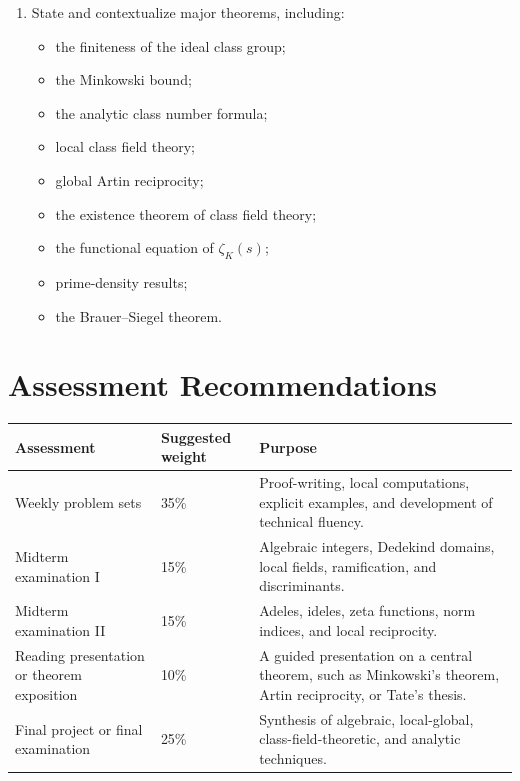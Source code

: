 \documentclass[11pt]{article}
\begin{document}
\begin{enumerate}
    \item State and contextualize major theorems, including:
    \begin{itemize}
        \item the finiteness of the ideal class group;
        \item the Minkowski bound;
        \item the analytic class number formula;
        \item local class field theory;
        \item global Artin reciprocity;
        \item the existence theorem of class field theory;
        \item the functional equation of $\zeta_K(s)$;
        \item prime-density results;
        \item the Brauer--Siegel theorem.
    \end{itemize}
\end{enumerate}

\section{Assessment Recommendations}

\begin{longtable}{p{}p{}p{}}
\toprule
\textbf{Assessment} & \textbf{Suggested weight} & \textbf{Purpose} \\
\midrule
\endhead

Weekly problem sets &
35\% &
Proof-writing, local computations, explicit examples, and development of technical fluency. \\

Midterm examination I &
15\% &
Algebraic integers, Dedekind domains, local fields, ramification, and discriminants. \\

Midterm examination II &
15\% &
Adeles, ideles, zeta functions, norm indices, and local reciprocity. \\

Reading presentation or theorem exposition &
10\% &
A guided presentation on a central theorem, such as Minkowski's theorem, Artin reciprocity, or Tate's thesis. \\

Final project or final examination &
25\% &
Synthesis of algebraic, local-global, class-field-theoretic, and analytic techniques. \\
\bottomrule
\end{longtable}
\end{document}

